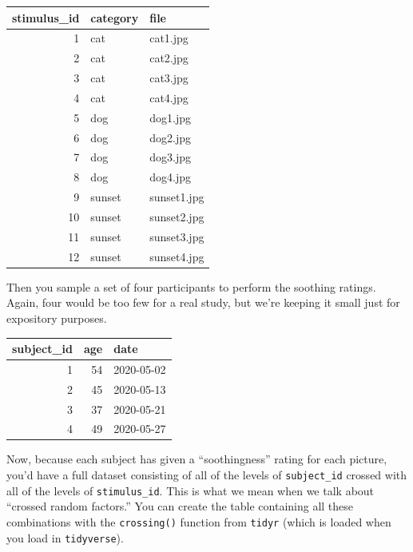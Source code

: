 \documentclass[]{book}
\newenvironment{Shaded}{\begin{snugshade}}{\end{snugshade}}
\newcommand{\KeywordTok}[1]{\textcolor[rgb]{0.13,0.29,0.53}{\textbf{#1}}}
\newcommand{\NormalTok}[1]{#1}
\newcommand{\OperatorTok}[1]{\textcolor[rgb]{0.81,0.36,0.00}{\textbf{#1}}}
\newcommand{\StringTok}[1]{\textcolor[rgb]{0.31,0.60,0.02}{#1}}
\begin{document}
\begin{tabular}{r|l|l}
\hline
stimulus\_id & category & file\\
\hline
1 & cat & cat1.jpg\\
\hline
2 & cat & cat2.jpg\\
\hline
3 & cat & cat3.jpg\\
\hline
4 & cat & cat4.jpg\\
\hline
5 & dog & dog1.jpg\\
\hline
6 & dog & dog2.jpg\\
\hline
7 & dog & dog3.jpg\\
\hline
8 & dog & dog4.jpg\\
\hline
9 & sunset & sunset1.jpg\\
\hline
10 & sunset & sunset2.jpg\\
\hline
11 & sunset & sunset3.jpg\\
\hline
12 & sunset & sunset4.jpg\\
\hline
\end{tabular}

Then you sample a set of four participants to perform the soothing ratings. Again, four would be too few for a real study, but we're keeping it small just for expository purposes.

\begin{tabular}{r|r|l}
\hline
subject\_id & age & date\\
\hline
1 & 54 & 2020-05-02\\
\hline
2 & 45 & 2020-05-13\\
\hline
3 & 37 & 2020-05-21\\
\hline
4 & 49 & 2020-05-27\\
\hline
\end{tabular}

Now, because each subject has given a ``soothingness'' rating for each picture, you'd have a full dataset consisting of all of the levels of \texttt{subject\_id} crossed with all of the levels of \texttt{stimulus\_id}. This is what we mean when we talk about ``crossed random factors.'' You can create the table containing all these combinations with the \texttt{crossing()} function from \texttt{tidyr} (which is loaded when you load in \texttt{tidyverse}).

\begin{Shaded}
\end{Shaded}
\end{document}
